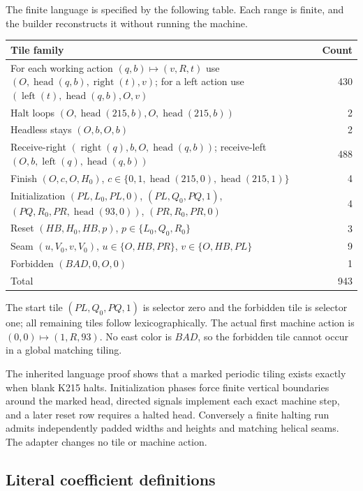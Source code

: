 \documentclass[11pt,a4paper]{article}
\theoremstyle{remark}\newtheorem{remark}[theorem]{Remark}
\begin{document}
The finite language is specified by the following table. Each range is
finite, and the builder reconstructs it without running the machine.
\begin{center}\small
\begin{tabular}{@{}>{\raggedright\arraybackslash}p{.79\linewidth}r@{}}
\toprule
Tile family & Count\\
\midrule
For each working action $(q,b)\mapsto(v,R,t)$ use
$(O,\operatorname{head}(q,b),\operatorname{right}(t),v)$;
for a left action use $(\operatorname{left}(t),\operatorname{head}(q,b),O,v)$ & 430\\
Halt loops $(O,\operatorname{head}(215,b),O,\operatorname{head}(215,b))$ & 2\\
Headless stays $(O,b,O,b)$ & 2\\
Receive-right $(\operatorname{right}(q),b,O,\operatorname{head}(q,b))$;
receive-left $(O,b,\operatorname{left}(q),\operatorname{head}(q,b))$ & 488\\
Finish $(O,c,O,H_0)$, $c\in\{0,1,\operatorname{head}(215,0),\operatorname{head}(215,1)\}$ & 4\\
Initialization $(PL,L_0,PL,0)$, $(PL,Q_0,PQ,1)$,
$(PQ,R_0,PR,\operatorname{head}(93,0))$, $(PR,R_0,PR,0)$ & 4\\
Reset $(HB,H_0,HB,p)$, $p\in\{L_0,Q_0,R_0\}$ & 3\\
Seam $(u,V_0,v,V_0)$, $u\in\{O,HB,PR\}$, $v\in\{O,HB,PL\}$ & 9\\
Forbidden $(BAD,0,O,0)$ & 1\\
\midrule
Total & 943\\
\bottomrule
\end{tabular}
\end{center}
The start tile $(PL,Q_0,PQ,1)$ is selector zero and the forbidden tile
is selector one; all remaining tiles follow lexicographically.
The actual first machine action is $(0,0)\mapsto(1,R,93)$.
No east color is $BAD$, so the forbidden tile cannot occur in a global
matching tiling.

The inherited language proof shows that a marked periodic tiling exists
exactly when blank K215 halts. Initialization phases force finite vertical
boundaries around the marked head, directed signals implement each exact
machine step, and a later reset row requires a halted head. Conversely a
finite halting run admits independently padded widths and heights and
matching helical seams. The adapter changes no tile or machine action.

\subsection{Literal coefficient definitions}
\end{document}
